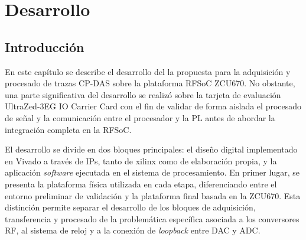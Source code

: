 %
%
%
% 
%
%
%
%

\chapter{Desarrollo}
\label{cha:desarrollo}

\section{Introducción}

En este capítulo se describe el desarrollo del la propuesta para la adquisición y procesado de trazas CP-DAS sobre la plataforma RFSoC ZCU670. No obstante, una parte significativa del desarrollo se realizó sobre la tarjeta de evaluación UltraZed-3EG IO Carrier Card con el fin de validar de forma aislada el procesado de señal y la comunicación entre el procesador y la PL antes de abordar la integración completa en la RFSoC.

El desarrollo se divide en dos bloques principales: el diseño digital implementado en Vivado a través de IPs, tanto de xilinx como de elaboración propia, y la aplicación \textit{software} ejecutada en el sistema de procesamiento. En primer lugar, se presenta la plataforma física utilizada en cada etapa, diferenciando entre el entorno preliminar de validación y la plataforma final basada en la ZCU670. Esta distinción permite separar el desarrollo de los bloques de adquisición, transferencia y procesado de la problemática específica asociada a los conversores RF, al sistema de reloj y a la conexión de \textit{loopback} entre DAC y ADC.

